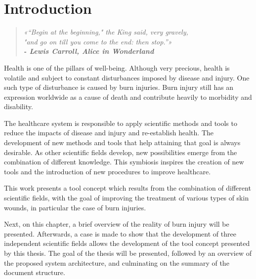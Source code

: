 \newcommand{\novathesis}{\emph{novathesis}}
\newcommand{\novathesisclass}{\texttt{novathesis.cls}}


\chapter{Introduction}
\label{cha:introduction}

\begin{quotation}
\begin{flushright}
\itshape
«“Begin at the beginning," the King said, very gravely, \\"and go on till you come to the end: then stop.”»\\
\textbf{- Lewis Carroll, Alice in Wonderland}
\end{flushright}
\end{quotation}

Health is one of the pillars of well-being. Although very precious, health is volatile and subject to constant disturbances imposed by disease and injury. One such type of disturbance is caused by burn injuries. Burn injury still has an expression worldwide as a cause of death and contribute heavily to morbidity and disability.

The healthcare system is responsible to apply scientific methods and tools to reduce the impacts of disease and injury and re-establish health. The development of new methods and tools that help attaining that goal is always desirable. As other scientific fields develop, new possibilities emerge from the combination of different knowledge. This symbiosis inspires the creation of new tools and the introduction of new procedures to improve healthcare.

This work presents a tool concept which results from the combination of different scientific fields, with the goal of improving the treatment of various types of skin wounds, in particular the case of burn injuries.\bigskip

Next, on this chapter, a brief overview of the reality of burn injury will be presented. Afterwards, a case is made to show that the development of three independent scientific fields allows the development of the tool concept presented by this thesis. The goal of the thesis will be presented, followed by an overview of the proposed system architecture, and culminating on the summary of the document structure.

